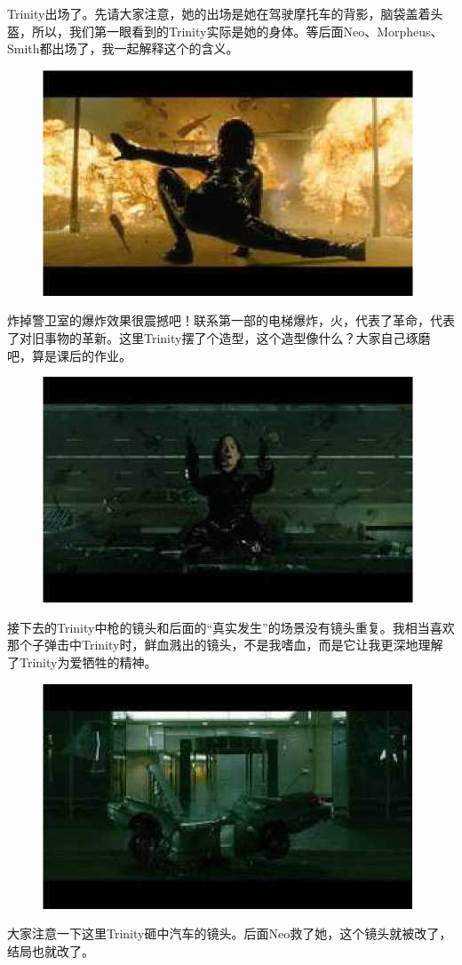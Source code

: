 \documentclass[UTF8]{ctexart}
\begin{document}
Trinity出场了。先请大家注意，她的出场是她在驾驶摩托车的背影，脑袋盖着头盔，所以，我们第一眼看到的Trinity实际是她的身体。等后面Neo、Morpheus、Smith都出场了，我一起解释这个的含义。

\begin{figure}[htb]
\centering
\includegraphics[width=0.5\linewidth]{fig/read_reloaded-7}
\end{figure}

炸掉警卫室的爆炸效果很震撼吧！联系第一部的电梯爆炸，火，代表了革命，代表了对旧事物的革新。这里Trinity摆了个造型，这个造型像什么？大家自己琢磨吧，算是课后的作业。

\begin{figure}[htb]
\centering
\includegraphics[width=0.5\linewidth]{fig/read_reloaded-9}
\end{figure}

接下去的Trinity中枪的镜头和后面的“真实发生”的场景没有镜头重复。我相当喜欢那个子弹击中Trinity时，鲜血溅出的镜头，不是我嗜血，而是它让我更深地理解了Trinity为爱牺牲的精神。

\begin{figure}[!htb]
\centering
\includegraphics[width=0.5\linewidth]{fig/read_reloaded-10}
\end{figure}

大家注意一下这里Trinity砸中汽车的镜头。后面Neo救了她，这个镜头就被改了，结局也就改了。
\end{document}
